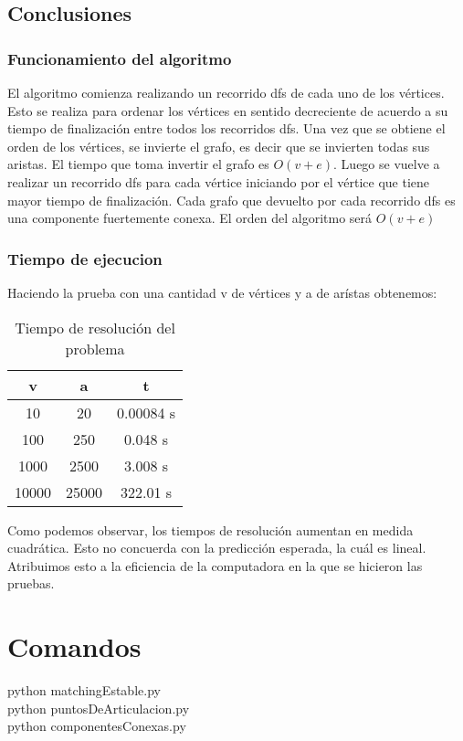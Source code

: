 \documentclass{article}
\begin{document}
        \subsection{Conclusiones}
            \subsubsection{Funcionamiento del algoritmo}
                El algoritmo comienza realizando un recorrido dfs de cada uno de los
                vértices. Esto se realiza para ordenar los vértices en sentido
                decreciente de acuerdo a su tiempo de finalización entre todos los
                recorridos dfs. Una vez que se obtiene el orden de los vértices,
                se invierte el grafo, es decir que se invierten todas sus aristas.
                El tiempo que toma invertir el grafo es $O(v+e)$. Luego se vuelve a
                realizar un recorrido dfs para cada vértice iniciando por el vértice
                que tiene mayor tiempo de finalización. Cada grafo que devuelto por cada
                recorrido dfs es una componente fuertemente conexa.
                El orden del algoritmo será $O(v+e)$

            \subsubsection{Tiempo de ejecucion}
              Haciendo la prueba con una cantidad v de vértices y a de arístas obtenemos:
                \begin{table}[h!]
                    \centering
                    \caption{Tiempo de resolución del problema}
                    \begin{tabular}{c|c|c}
                        v & a & t \\
                        \hline
                        10 & 20 & 0.00084 s \\
                        \hline
                        100 & 250 & 0.048 s \\
                        \hline
                        1000 & 2500 & 3.008 s \\
                        \hline
                        10000 & 25000 & 322.01 s
                    \end{tabular}
                \end{table}

                Como podemos observar, los tiempos de resolución aumentan en medida
                cuadrática. Esto no concuerda con la predicción esperada, la cuál es
                lineal. Atribuimos esto a la eficiencia de la computadora en la que
                se hicieron las pruebas.

    \section{Comandos}
      python matchingEstable.py \\
      python puntosDeArticulacion.py \\
      python componentesConexas.py
\end{document}
